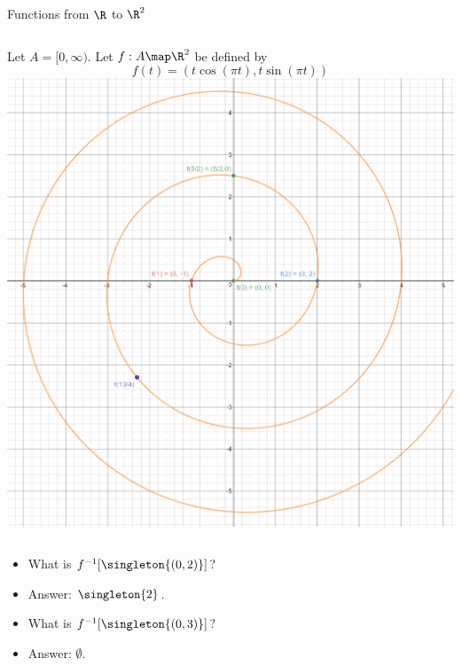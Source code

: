 \documentclass{beamer}
\begin{document}
\begin{frame}{Functions from $\R$ to $\R^2$}

\begin{columns}
\column[T]{5cm}
Let $A=[0, \infty)$. Let $f:A\map \R^2$ be defined by
$$f(t) = (t \cos(\pi t), t \sin(\pi t))$$
\column[T]{5cm}
\includegraphics[scale=0.1]{spiral}
\end{columns}

\begin{itemize}
\item What is $f^{-1}[\singleton{(0,2)}]$?
\item Answer: $\singleton{2}$.
\item What is $f^{-1}[\singleton{(0,3)}]$?
\item Answer: $\emptyset$.
\end{itemize}

\end{frame}
\end{document}
